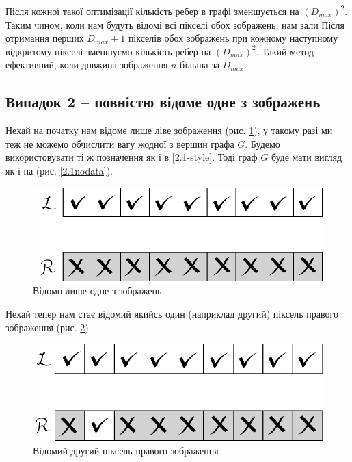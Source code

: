 \documentclass{ConfFTI}
\begin{document}
Після кожної такої оптимізації кількість ребер в графі зменшується на $(D_{max})^2$. Таким чином, коли нам будуть відомі всі пікселі обох зображень, нам зали
Після отримання перших $D_{max} + 1$ пікселів обох зображень при кожному наступному відкритому пікселі зменшуємо кількість ребер на $(D_{max})^2$. Такий метод ефективний, коли довжина зображення $n$ більша за $D_{max}$.	
 

\subsection{Випадок 2 -- повністю відоме одне з зображень} \label{2.2}
Нехай на початку нам відоме лише ліве зображення (рис. \ref{2.2oneimage}), у такому разі ми теж не можемо обчислити вагу жодної з вершин графа $G$. Будемо використовувати ті ж позначення як і в  \ref{2.1-style}. Тоді граф $G$ буде мати вигляд як і на (рис. \ref{2.1nodata}).
\begin{figure}[h!]
	\centering
	\includegraphics[scale = 0.5]{allclosed.pdf}
	\caption{Відомо лише одне з зображень}
	\label{2.2oneimage}
\end{figure}

Нехай тепер нам стає відомий якийсь  один (наприклад другий) піксель правого зображення (рис. \ref{2.2oneRpixel}). 
\begin{figure}[h!]
	\centering
	\includegraphics[scale = 0.5]{pixelknown.pdf}
	\caption{Відомий другий піксель правого зображення}
	\label{2.2oneRpixel}
\end{figure}
	
\end{document}
